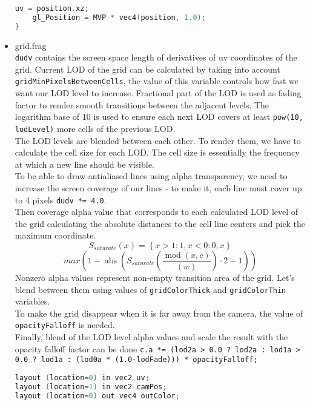 \begin{itemize}
\begin{lstlisting}[language=c++, caption=(./assets/shaders/grid.vert)]
    uv = position.xz;
    gl_Position = MVP * vec4(position, 1.0);
}
\end{lstlisting}
    \item grid.frag\\
    \texttt{dudv} contains the screen space length of derivatives of uv coordinates of the grid. Current LOD of the grid can be calculated by taking into account \texttt{gridMinPixelsBetweenCells}, the value of this variable controls how fast we want our LOD level to increase. Fractional part of the LOD is used as fading factor to render smooth transitions between the adjacent levels. The logarithm base of 10 is used to ensure each next LOD covers at least \texttt{pow(10, lodLevel)} more cells of the previous LOD.\\
    The LOD levels are blended between each other. To render them, we have to calculate the cell size for each LOD. The cell size is essentially the frequency at which a new line should be visible.\\
    To be able to draw antialiased lines using alpha transparency, we need to increase the screen coverage of our lines - to make it, each line must cover up to 4 pixels \texttt{dudv *= 4.0}.\\
    Then coverage alpha value that corresponds to each calculated LOD level of the grid calculating the absolute distances to the cell line centers and pick the maximum coordinate.\\
\begin{equation}
S_{saturate}\left(x\right)=\left\{x>1:1,x<0:0,x\right\}
\end{equation}
\begin{equation}
max\left(1-\operatorname{abs}\left(S_{saturate}\left(\frac{\operatorname{mod}\left(x,c\right)}{\left(w\right)}\right)\cdot2-1\right)\right)
\end{equation}
    Nonzero alpha values represent non-empty transition area of the grid. Let's blend between them using values of \texttt{gridColorThick} and \texttt{gridColorThin} variables.\\
    To make the grid disappear when it is far away from the camera, the value of \texttt{opacityFalloff} is needed.\\
    Finally, blend of the LOD level alpha values and scale the result with the opacity falloff factor can be done \texttt{c.a *= (lod2a > 0.0 ? lod2a : lod1a > 0.0 ? lod1a : (lod0a * (1.0-lodFade))) * opacityFalloff;}
\begin{lstlisting}[language=c++, caption=Grid fragment shader(./assets/shaders/grid.frag)]
layout (location=0) in vec2 uv;
layout (location=1) in vec2 camPos;
layout (location=0) out vec4 outColor;


\end{lstlisting}
\end{itemize}
